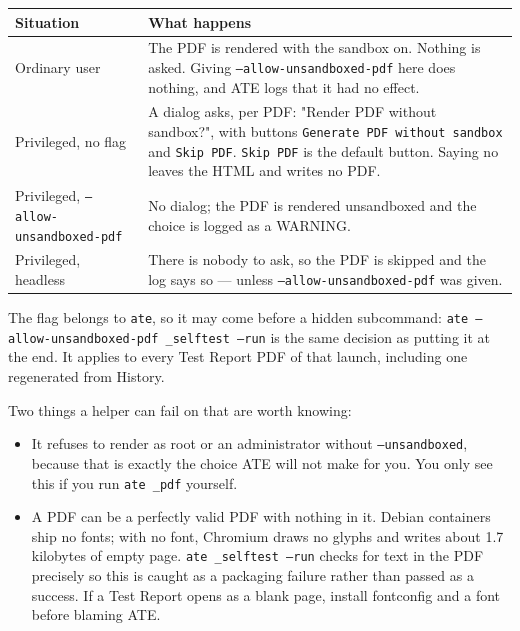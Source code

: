 \begin{center}
\footnotesize
\begin{tabular}{@{}>{\raggedright\arraybackslash}p{4.2cm}>{\raggedright\arraybackslash}p{10.6cm}@{}}
\toprule
Situation & What happens \\
\midrule
Ordinary user & The PDF is rendered with the sandbox on. Nothing is asked. Giving
  \texttt{--allow-unsandboxed-pdf} here does nothing, and ATE logs that it had no effect. \\
Privileged, no flag & A dialog asks, per PDF: "Render PDF without sandbox?", with buttons
  \texttt{Generate PDF without sandbox} and \texttt{Skip PDF}. \texttt{Skip PDF} is the default
  button. Saying no leaves the HTML and writes no PDF. \\
Privileged, \texttt{--allow-}\allowbreak\texttt{unsandboxed-pdf} & No dialog; the PDF is rendered unsandboxed and the
  choice is logged as a WARNING. \\
Privileged, headless & There is nobody to ask, so the PDF is skipped and the log says so --- unless
  \texttt{--allow-unsandboxed-pdf} was given. \\
\bottomrule
\end{tabular}
\end{center}

The flag belongs to \texttt{ate}, so it may come before a hidden subcommand:
\texttt{ate --allow-unsandboxed-pdf \_selftest --run} is the same decision as putting it at the end.
It applies to every Test Report PDF of that launch, including one regenerated from History.

Two things a helper can fail on that are worth knowing:

\begin{itemize}
  \item It refuses to render as root or an administrator without \texttt{--unsandboxed}, because
    that is exactly the choice ATE will not make for you. You only see this if you run
    \texttt{ate \_pdf} yourself.
  \item A PDF can be a perfectly valid PDF with nothing in it. Debian containers ship no fonts; with
    no font, Chromium draws no glyphs and writes about 1.7 kilobytes of empty page. \texttt{ate
    \_selftest --run} checks for text in the PDF precisely so this is caught as a packaging failure
    rather than passed as a success. If a Test Report opens as a blank page, install fontconfig and
    a font before blaming ATE.
\end{itemize}

